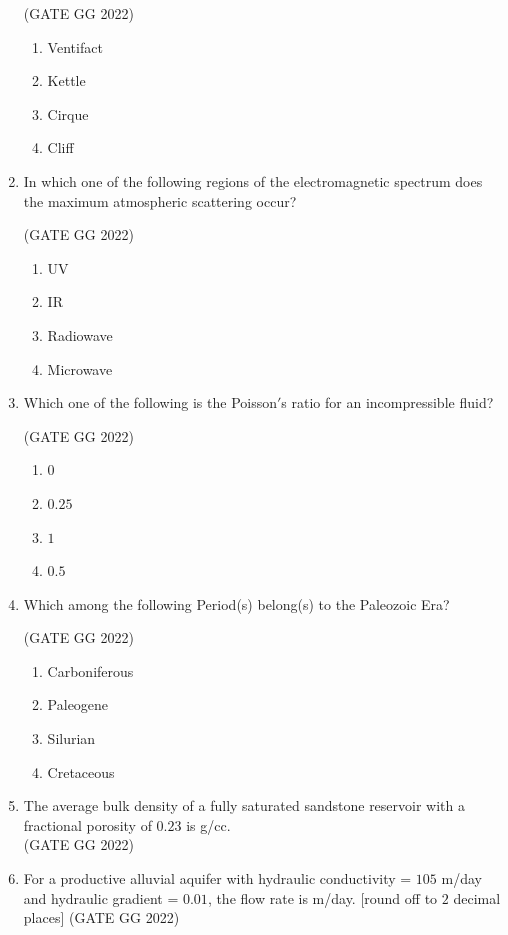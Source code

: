 \documentclass[journal]{IEEEtran}
\begin{document}
\begin{enumerate}[start=1]
\hfill(GATE GG 2022)
\begin{enumerate}
\item Ventifact
\item Kettle
\item Cirque
\item Cliff
\end{enumerate}

\item In which one of the following regions of the electromagnetic spectrum does the maximum atmospheric scattering occur?

\hfill(GATE GG 2022)
\begin{enumerate}
\item UV
\item IR
\item Radiowave
\item Microwave
\end{enumerate}

\item Which one of the following is the Poisson$'$s ratio for an incompressible fluid?

\hfill(GATE GG 2022)
\begin{enumerate}
\item $0$
\item $0.25$
\item $1$
\item $0.5$
\end{enumerate}

 \item Which among the following Period(s) belong(s) to the Paleozoic Era?

\hfill(GATE GG 2022)
\begin{enumerate}
\item Carboniferous
\item Paleogene
\item Silurian
\item Cretaceous
\end{enumerate}
\vspace{0.3cm}

\item The average bulk density of a fully saturated sandstone reservoir with a fractional porosity of $0.23$ is  \makebox[2cm]{\hrulefill} g/cc.  \\
\hfill(GATE GG 2022)

\vspace{0.5cm}
\item For a productive alluvial aquifer with hydraulic conductivity = $105$ m/day and hydraulic gradient = $0.01$, the flow rate is \makebox[2cm]{\hrulefill} m/day. [round off to $2$ decimal places]
\hfill(GATE GG 2022)
\vspace{0.5cm}


\end{enumerate}
\end{document}
